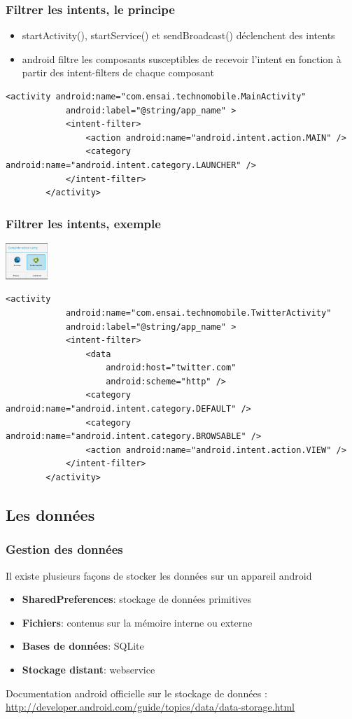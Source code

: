 \documentclass{beamer}
\begin{document}
\begin{frame}[fragile]
\frametitle{Filtrer les intents, le principe}
\begin{itemize}
    \item startActivity(), startService() et sendBroadcast() déclenchent des
    intents
	\item android filtre les composants susceptibles de recevoir l'intent en
	fonction à partir des intent-filters de chaque composant
\end{itemize}

\begin{lstlisting}
<activity android:name="com.ensai.technomobile.MainActivity"
            android:label="@string/app_name" >
            <intent-filter>
                <action android:name="android.intent.action.MAIN" />
                <category android:name="android.intent.category.LAUNCHER" />
            </intent-filter>
        </activity>
\end{lstlisting}
\end{frame}
\begin{frame}[fragile]
\frametitle{Filtrer les intents, exemple}
\includegraphics[width=45pt]{img/intentchooser.jpg}
\begin{lstlisting}
<activity
            android:name="com.ensai.technomobile.TwitterActivity"
            android:label="@string/app_name" >
            <intent-filter>
                <data
                    android:host="twitter.com"
                    android:scheme="http" />
                <category android:name="android.intent.category.DEFAULT" />
                <category android:name="android.intent.category.BROWSABLE" />
                <action android:name="android.intent.action.VIEW" />
            </intent-filter>
        </activity>
\end{lstlisting}
\end{frame}

\subsection{Les données}
\frametitle{Gestion des données}
\begin{frame}
Il existe plusieurs façons de stocker les données sur un appareil android
\begin{itemize}
    \item \textbf{SharedPreferences}: stockage de données primitives
    \item \textbf{Fichiers}: contenus sur la mémoire interne ou externe
    \item \textbf{Bases de données}: SQLite
    \item \textbf{Stockage distant}: webservice
\end{itemize}
Documentation android officielle sur le stockage de données : \url{http://developer.android.com/guide/topics/data/data-storage.html}
\end{frame}
\end{document}
